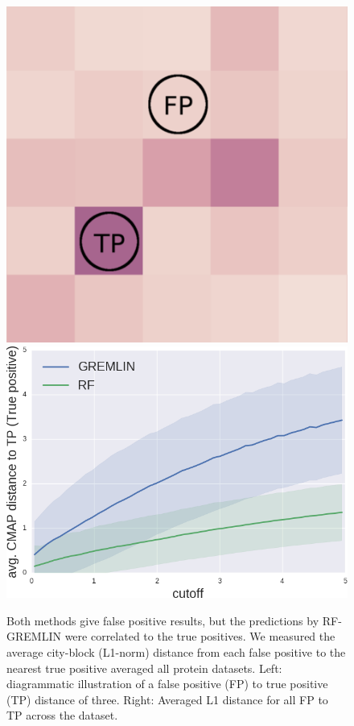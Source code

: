 \documentclass[landscape]{sciposter}
\newlength{\customfigheight}
\begin{document}
\begin{multicols}{3}
\begin{figure}
    \center 
    \hfill%
    \includegraphics[height=\customfigheight]{figures/local_structure_distance.png}%
    \hfill%
    \includegraphics[height=\customfigheight]{figures/FP_distance.png}%
    \hfill%
    \hspace{0em}

\caption{%
Both methods give false positive results, but the predictions by RF-GREMLIN were correlated to the true positives. We measured the average city-block (L1-norm) distance from each false positive to the nearest true positive averaged all protein datasets. Left: diagrammatic illustration of a false positive (FP) to true positive (TP) distance of three. Right: Averaged L1 distance for all FP to TP across the dataset.
}
\end{figure}


\end{multicols}
\end{document}
